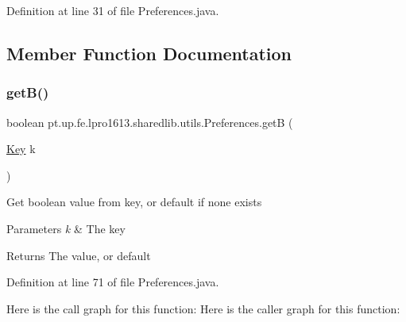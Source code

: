 Definition at line 31 of file Preferences.\+java.



\subsection{Member Function Documentation}
\hypertarget{classpt_1_1up_1_1fe_1_1lpro1613_1_1sharedlib_1_1utils_1_1_preferences_ad42ac07907c3bb6066925a1de8706007}{}\label{classpt_1_1up_1_1fe_1_1lpro1613_1_1sharedlib_1_1utils_1_1_preferences_ad42ac07907c3bb6066925a1de8706007} 
\subsubsection{\texorpdfstring{get\+B()}{getB()}}
{\footnotesize\ttfamily boolean pt.\+up.\+fe.\+lpro1613.\+sharedlib.\+utils.\+Preferences.\+getB (\begin{DoxyParamCaption}\item[{\hyperlink{interfacept_1_1up_1_1fe_1_1lpro1613_1_1sharedlib_1_1utils_1_1_preferences_1_1_key}{Key}}]{k }\end{DoxyParamCaption})}

Get boolean value from key, or default if none exists


\begin{DoxyParams}{Parameters}
{\em k} & The key \\
\hline
\end{DoxyParams}
\begin{DoxyReturn}{Returns}
The value, or default 
\end{DoxyReturn}


Definition at line 71 of file Preferences.\+java.

Here is the call graph for this function\+:
Here is the caller graph for this function\+:
\hypertarget{classpt_1_1up_1_1fe_1_1lpro1613_1_1sharedlib_1_1utils_1_1_preferences_a6b5169368a838aca6c6880826294aea7}{}\label{classpt_1_1up_1_1fe_1_1lpro1613_1_1sharedlib_1_1utils_1_1_preferences_a6b5169368a838aca6c6880826294aea7} 
